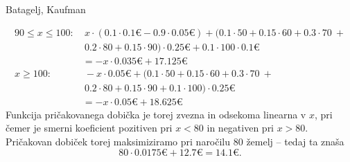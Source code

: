 \begin{naloga}{Batagelj, Kaufman}{\cite[Naloga~4.2]{bk}}
\begin{odgovor}
\begin{align*}
90 \le x \le 100: &\ x \cdot (0.1 \cdot 0.1 € - 0.9 \cdot 0.05 €) +
                     (0.1 \cdot 50 + 0.15 \cdot 60 + 0.3 \cdot 70 \ + \\
                  &\  0.2 \cdot 80 + 0.15 \cdot 90) \cdot 0.25 € +
                     0.1 \cdot 100 \cdot 0.1 € \\
                  &= -x \cdot 0.035 € + 17.125 € \\
x \ge 100:        &\ -x \cdot 0.05 € +
                     (0.1 \cdot 50 + 0.15 \cdot 60 + 0.3 \cdot 70 \ + \\
                  &\  0.2 \cdot 80 + 0.15 \cdot 90 + 0.1 \cdot 100)
                     \cdot 0.25 € \\
                  &= -x \cdot 0.05 € + 18.625 €
\end{align*}
Funkcija pričakovanega dobička je torej zvezna in odsekoma linearna v $x$,
pri čemer je smerni koeficient pozitiven pri $x < 80$
in negativen pri $x > 80$.
Pričakovan dobiček torej maksimiziramo pri naročilu $80$ žemelj
-- tedaj ta znaša
$$
80 \cdot 0.0175 € + 12.7 € = 14.1 € .
$$
\end{odgovor}
\end{naloga}


